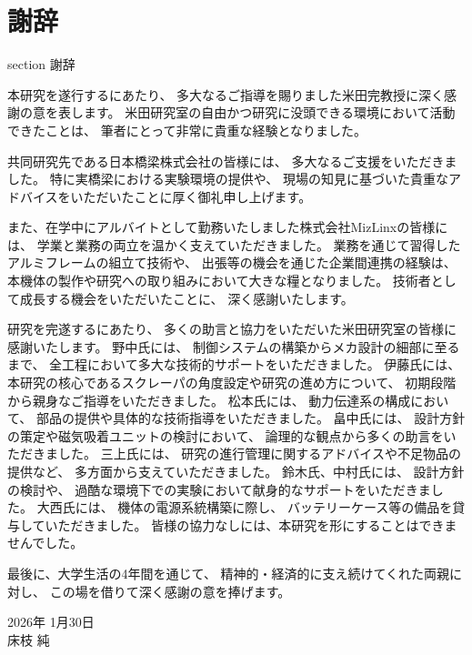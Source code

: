 \lhead {}
\newpage
{}
\section* {謝辞}
 {section} {謝辞}
\vspace {5mm}

本研究を遂行するにあたり、
多大なるご指導を賜りました米田完教授に深く感謝の意を表します。
米田研究室の自由かつ研究に没頭できる環境において活動できたことは、
筆者にとって非常に貴重な経験となりました。

共同研究先である日本橋梁株式会社の皆様には、
多大なるご支援をいただきました。
特に実橋梁における実験環境の提供や、
現場の知見に基づいた貴重なアドバイスをいただいたことに厚く御礼申し上げます。

また、在学中にアルバイトとして勤務いたしました株式会社MizLinxの皆様には、
学業と業務の両立を温かく支えていただきました。
業務を通じて習得したアルミフレームの組立て技術や、
出張等の機会を通じた企業間連携の経験は、
本機体の製作や研究への取り組みにおいて大きな糧となりました。
技術者として成長する機会をいただいたことに、
深く感謝いたします。

研究を完遂するにあたり、
多くの助言と協力をいただいた米田研究室の皆様に感謝いたします。
野中氏には、
制御システムの構築からメカ設計の細部に至るまで、
全工程において多大な技術的サポートをいただきました。
伊藤氏には、
本研究の核心であるスクレーパの角度設定や研究の進め方について、
初期段階から親身なご指導をいただきました。
松本氏には、
動力伝達系の構成において、
部品の提供や具体的な技術指導をいただきました。
畠中氏には、
設計方針の策定や磁気吸着ユニットの検討において、
論理的な観点から多くの助言をいただきました。
三上氏には、
研究の進行管理に関するアドバイスや不足物品の提供など、
多方面から支えていただきました。
鈴木氏、中村氏には、
設計方針の検討や、
過酷な環境下での実験において献身的なサポートをいただきました。
大西氏には、
機体の電源系統構築に際し、
バッテリーケース等の備品を貸与していただきました。
皆様の協力なしには、本研究を形にすることはできませんでした。

最後に、大学生活の4年間を通じて、
精神的・経済的に支え続けてくれた両親に対し、
この場を借りて深く感謝の意を捧げます。

\vspace{10mm}
\begin{flushright}
2026年 1月30日 \\
床枝 純
\end{flushright}